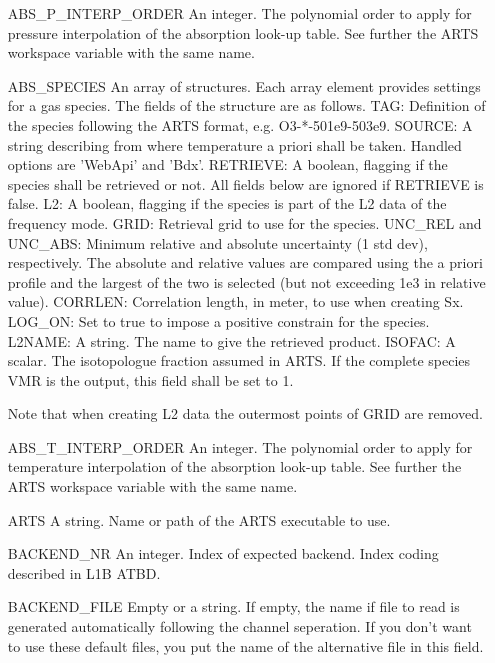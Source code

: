 \begin{changemargin}{2.5cm}{0.0cm} 

\begin{itemize}
\item[{ABS\_P\_INTERP\_ORDER}]
An integer. The polynomial order to apply for pressure interpolation of the
absorption look-up table. See further the ARTS workspace variable with the
same name.

\item[{ABS\_SPECIES}]
An array of structures. Each array element provides settings for a gas
species. The fields of the structure are as follows. TAG: Definition of the
species following the ARTS format, e.g. O3-*-501e9-503e9. SOURCE: A string
describing from where temperature a priori shall be taken. Handled options
are 'WebApi' and 'Bdx'. RETRIEVE: A boolean, flagging if the species shall
be retrieved or not. All fields below are ignored if RETRIEVE is false. L2: A
boolean, flagging if the species is part of the L2 data of the frequency mode.
GRID: Retrieval grid to use for the species. UNC\_REL and UNC\_ABS: Minimum
relative and absolute uncertainty (1 std dev), respectively. The absolute
and relative values are compared using the a priori profile and the largest
of the two is selected (but not exceeding 1e3 in relative value). CORRLEN:
Correlation length, in meter, to use when creating Sx. LOG\_ON: Set to true
to impose a positive constrain for the species. L2NAME: A string. The name
to give the retrieved product. ISOFAC: A scalar. The isotopologue fraction
assumed in ARTS. If the complete species VMR is the
output, this field shall be set to 1.

Note that when creating L2 data the outermost points of GRID are removed.

\item[{ABS\_T\_INTERP\_ORDER}]
An integer. The polynomial order to apply for temperature interpolation of the
absorption look-up table. See further the ARTS workspace variable with the
same name.

\item[{ARTS}]
A string. Name or path of the ARTS executable to use.

\item[{BACKEND\_NR}]
An integer. Index of expected backend. Index coding described in L1B ATBD.

\item[{BACKEND\_FILE}]
Empty or a string. If empty, the name if file to read is generated
automatically following the channel seperation. If you don't want to use
these default files, you put the name of the alternative file in this field.


\end{itemize}
\end{changemargin}
